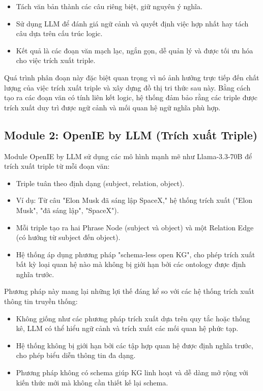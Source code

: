 \documentclass[../main.tex]{subfiles}
\begin{document}
\begin{itemize}
\item Tách văn bản thành các câu riêng biệt, giữ nguyên ý nghĩa.
\item Sử dụng LLM để đánh giá ngữ cảnh và quyết định việc hợp nhất hay tách câu dựa trên cấu trúc logic.
\item Kết quả là các đoạn văn mạch lạc, ngắn gọn, dễ quản lý và được tối ưu hóa cho việc trích xuất triple.
\end{itemize}

Quá trình phân đoạn này đặc biệt quan trọng vì nó ảnh hưởng trực tiếp đến chất lượng của việc trích xuất triple và xây dựng đồ thị tri thức sau này. Bằng cách tạo ra các đoạn văn có tính liên kết logic, hệ thống đảm bảo rằng các triple được trích xuất duy trì được ngữ cảnh và mối quan hệ ngữ nghĩa phù hợp.

\subsection{Module 2: OpenIE by LLM (Trích xuất Triple)}
Module OpenIE by LLM sử dụng các mô hình mạnh mẽ như Llama-3.3-70B để trích xuất triple từ mỗi đoạn văn:

\begin{itemize}
\item Triple tuân theo định dạng (subject, relation, object).
\item Ví dụ: Từ câu "Elon Musk đã sáng lập SpaceX," hệ thống trích xuất ("Elon Musk", "đã sáng lập", "SpaceX").
\item Mỗi triple tạo ra hai Phrase Node (subject và object) và một Relation Edge (có hướng từ subject đến object).
\item Hệ thống áp dụng phương pháp "schema-less open KG", cho phép trích xuất bất kỳ loại quan hệ nào mà không bị giới hạn bởi các ontology được định nghĩa trước.
\end{itemize}

Phương pháp này mang lại những lợi thế đáng kể so với các hệ thống trích xuất thông tin truyền thống:
\begin{itemize}
\item Không giống như các phương pháp trích xuất dựa trên quy tắc hoặc thống kê, LLM có thể hiểu ngữ cảnh và trích xuất các mối quan hệ phức tạp.
\item Hệ thống không bị giới hạn bởi các tập hợp quan hệ được định nghĩa trước, cho phép biểu diễn thông tin đa dạng.
\item Phương pháp không có schema giúp KG linh hoạt và dễ dàng mở rộng với kiến thức mới mà không cần thiết kế lại schema.
\end{itemize}
\end{document}
